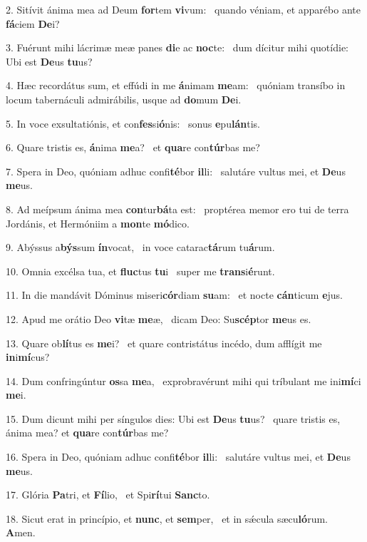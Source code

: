 2. Sitívit ánima mea ad Deum \textbf{for}tem \textbf{vi}vum: \ast\  quando véniam, et apparébo ante \textbf{fá}ciem \textbf{De}i?\

3. Fuérunt mihi lácrimæ meæ panes \textbf{di}e ac \textbf{noc}te: \ast\  dum dícitur mihi quotídie: Ubi est \textbf{De}us \textbf{tu}us?\

4. Hæc recordátus sum, et effúdi in me \textbf{á}nimam \textbf{me}am: \ast\  quóniam transíbo in locum tabernáculi admirábilis, usque ad \textbf{do}mum \textbf{De}i.\

5. In voce exsultatiónis, et con\textbf{fes}si\textbf{ó}nis: \ast\  sonus \textbf{e}pu\textbf{lán}tis.\

6. Quare tristis es, \textbf{á}nima \textbf{me}a? \ast\  et \textbf{qua}re con\textbf{túr}bas me?\

7. Spera in Deo, quóniam adhuc confi\textbf{té}bor \textbf{il}li: \ast\  salutáre vultus mei, et \textbf{De}us \textbf{me}us.\

8. Ad meípsum ánima mea \textbf{con}tur\textbf{bá}ta est: \ast\  proptérea memor ero tui de terra Jordánis, et Hermóniim a \textbf{mon}te \textbf{mó}dico.\

9. Abýssus a\textbf{býs}sum \textbf{ín}vocat, \ast\  in voce catarac\textbf{tá}rum tu\textbf{á}rum.\

10. Omnia excélsa tua, et \textbf{fluc}tus \textbf{tu}i \ast\  super me \textbf{trans}i\textbf{é}runt.\

11. In die mandávit Dóminus miseri\textbf{cór}diam \textbf{su}am: \ast\  et nocte \textbf{cán}ticum \textbf{e}jus.\

12. Apud me orátio Deo \textbf{vi}tæ \textbf{me}æ, \ast\  dicam Deo: Su\textbf{scép}tor \textbf{me}us es.\

13. Quare ob\textbf{lí}tus es \textbf{me}i? \ast\  et quare contristátus incédo, dum afflígit me \textbf{in}i\textbf{mí}cus?\

14. Dum confringúntur \textbf{os}sa \textbf{me}a, \ast\  exprobravérunt mihi qui tríbulant me ini\textbf{mí}ci \textbf{me}i.\

15. Dum dicunt mihi per síngulos dies: Ubi est \textbf{De}us \textbf{tu}us? \ast\  quare tristis es, ánima mea? et \textbf{qua}re con\textbf{túr}bas me?\

16. Spera in Deo, quóniam adhuc confi\textbf{té}bor \textbf{il}li: \ast\  salutáre vultus mei, et \textbf{De}us \textbf{me}us.\

17. Glória \textbf{Pa}tri, et \textbf{Fí}lio, \ast\  et Spi\textbf{rí}tui \textbf{Sanc}to.\

18. Sicut erat in princípio, et \textbf{nunc}, et \textbf{sem}per, \ast\  et in sǽcula sæcu\textbf{ló}rum. \textbf{A}men.\

